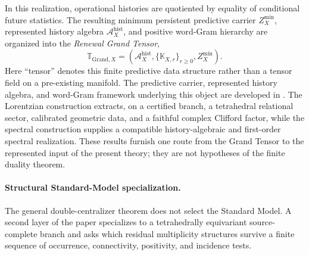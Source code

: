 \documentclass[11pt]{article}
\numberwithin{equation}{section}
\theoremstyle{definition}
\theoremstyle{remark}
\newcommand{\GTX}{\boldsymbol{\mathbb T}_{\mathrm{Grand},X}}
\begin{document}
In this realization, operational histories are quotiented by equality of
conditional future statistics.  The resulting minimum persistent predictive
carrier $Z_X^{\min}$, represented history algebra
$\mathcal A_X^{\mathrm{hist}}$, and positive word-Gram hierarchy are organized
into the \emph{Renewal Grand Tensor},
\begin{equation}
\boxed{
\GTX
=
\left(
\mathcal A_X^{\mathrm{hist}},
\{\mathbb K_{X,r}\}_{r\ge0},
Z_X^{\min}
\right).}
\label{eq:intro-grand-tensor}
\end{equation}
Here ``tensor'' denotes this finite predictive data structure rather than a
tensor field on a pre-existing manifold.  The predictive carrier, represented
history algebra, and word-Gram framework underlying this object are developed
in \cite{PelissierSpacetime2026,PelissierSpectral2026}.  The Lorentzian
construction \cite{PelissierSpacetime2026} extracts, on a certified branch, a
tetrahedral relational sector, calibrated geometric data, and a faithful
complex Clifford factor, while the spectral construction
\cite{PelissierSpectral2026} supplies a compatible history-algebraic and
first-order spectral realization.  These results furnish one route from the
Grand Tensor to the represented input of the present theory; they are not
hypotheses of the finite duality theorem.


\paragraph{Structural Standard-Model specialization.}

The general double-centralizer theorem does not select the Standard Model.
A second layer of the paper specializes to a tetrahedrally equivariant
source-complete branch and asks which residual multiplicity structures survive
a finite sequence of occurrence, connectivity, positivity, and incidence
tests.
\end{document}
